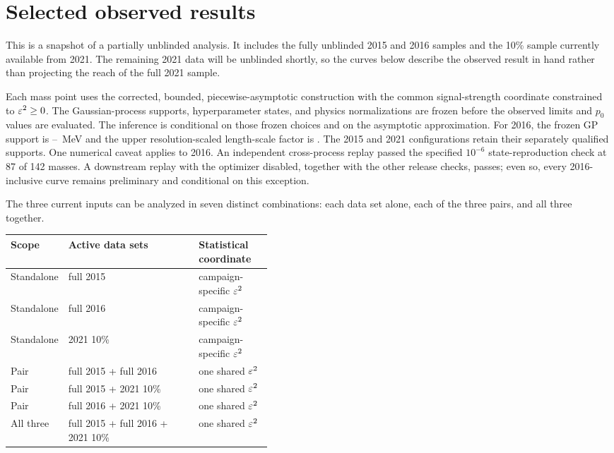 \section{Selected observed results}
\label{sec:selected-observed-results}


This is a snapshot of a partially unblinded analysis. It includes the fully unblinded
2015 and 2016 samples and the 10\% sample currently available from 2021. The
remaining 2021 data will be unblinded shortly, so the curves below describe the
observed result in hand rather than projecting the reach of the full 2021 sample.

Each mass point uses the corrected, bounded, piecewise-asymptotic \CLs{}
construction with the common signal-strength coordinate constrained to
$\varepsilon^2\geq 0$. The Gaussian-process supports, hyperparameter states, and physics
normalizations are frozen before the observed limits and $p_0$ values are evaluated.
The inference is conditional on those frozen choices and on
the asymptotic approximation. For 2016, the frozen GP support is
\FinalSixteenSupportLowMeV--\FinalSixteenSupportHighMeV~MeV and the upper
resolution-scaled length-scale factor is \FinalSixteenLengthScaleUpperFactor. The
2015 and 2021 configurations retain their separately qualified supports.
One numerical caveat applies to 2016. An independent cross-process replay passed the
specified $10^{-6}$ state-reproduction check at 87 of 142 masses. A downstream replay
with the optimizer disabled, together with the other release checks, passes; even so,
every 2016-inclusive curve remains preliminary and conditional on this exception.

The three current inputs can be analyzed in seven distinct combinations: each data set
alone, each of the three pairs, and all three together.

\begin{center}
\small
\begin{tabularx}{\linewidth}{@{}P{0.15\linewidth}Y P{0.28\linewidth}@{}}
\toprule
Scope & Active data sets & Statistical coordinate \\
\midrule
Standalone & full 2015 & campaign-specific $\varepsilon^2$ \\
Standalone & full 2016 & campaign-specific $\varepsilon^2$ \\
Standalone & 2021 10\% & campaign-specific $\varepsilon^2$ \\
Pair & full 2015 + full 2016 & one shared $\varepsilon^2$ \\
Pair & full 2015 + 2021 10\% & one shared $\varepsilon^2$ \\
Pair & full 2016 + 2021 10\% & one shared $\varepsilon^2$ \\
All three & full 2015 + full 2016 + 2021 10\% & one shared $\varepsilon^2$ \\
\bottomrule
\end{tabularx}
\end{center}

